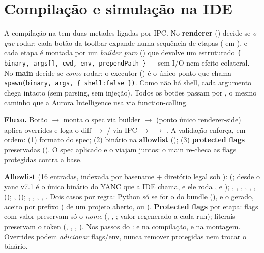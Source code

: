 \section{Compilação e simulação na IDE}
\label{sec:S07-compilacao-simulacao}

A compilação na  tem duas metades ligadas por IPC. No \textbf{renderer} () decide-se \emph{o que} rodar: cada botão da toolbar expande numa sequência de etapas ( em ), e cada etapa é montada por um \emph{builder puro} () que devolve um  estruturado \lstinline|{ binary, args[], cwd, env, prependPath }| --- sem I/O nem efeito colateral. No \textbf{main} decide-se \emph{como} rodar: o executor () é o único ponto que chama \lstinline|spawn(binary, args, { shell:false })|. Como não há shell, cada argumento chega intacto (sem parsing, sem injeção). Todos os botões passam por , o mesmo caminho que a Aurora Intelligence usa via function-calling.

\textbf{Fluxo.} Botão $\to$  monta o spec via builder $\to$  (ponto único renderer-side) aplica overrides e loga o diff $\to$ / via IPC $\to$  $\to$ . A validação enforça, em ordem: (1) formato do spec; (2) binário na \textbf{allowlist} (); (3) \textbf{protected flags} preservadas (). O spec aplicado e o  viajam juntos: o main re-checa as flags protegidas contra a base.

\textbf{Allowlist} (16 entradas, indexada por basename + diretório legal sob ):  (; desde o yanc v7.1 é o único binário do YANC que a IDE chama, e ele roda ,  e ); , , , , , ,  (); ,  (); , , , , . Dois casos por regra: Python só se for o do bundle (), e o  gerado, aceito por prefixo ( de um projeto aberto, ou ). \textbf{Protected flags} por etapa: flags com valor preservam só o \emph{nome} (, , ; valor regenerado a cada run); literais preservam o token (, , , ). Nos passos do :  e  na compilação,  e  na montagem. Overrides podem \emph{adicionar} flags/env, nunca remover protegidas nem trocar o binário.

